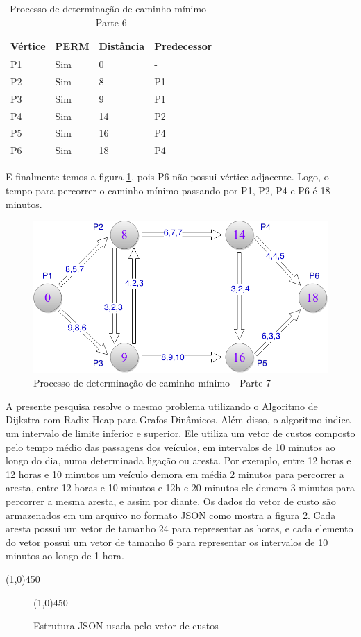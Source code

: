 \begin{table}[htbp]
	\centering
	\begin{tabular}{l l l l}
	\toprule
	Vértice & PERM & Distância & Predecessor\\
	\midrule
	P1 & Sim & 0 & - \\
	P2 & Sim & 8 & P1 \\
	P3 & Sim & 9 & P1 \\
	P4 & Sim & 14 & P2 \\
	P5 & Sim & 16 & P4 \\
	P6 & Sim & 18 & P4 \\
	\bottomrule
	\end{tabular}
\caption{Processo de determinação de caminho mínimo - Parte 6}
 \label{tab:leotab5}
\end{table}
\FloatBarrier

E finalmente temos a figura \ref{fig:leo8}, pois P6 não possui vértice adjacente. Logo, o 
tempo para percorrer o caminho mínimo passando por P1, P2, P4 e P6 é 18 minutos.

\begin{figure}[htbp]
\centering
 \includegraphics[width=.50\textwidth]{chapters/fig/leo8.png}
\caption{Processo de determinação de caminho mínimo - Parte 7}
\label{fig:leo8}
\end{figure}
\FloatBarrier

A presente pesquisa resolve o mesmo problema utilizando o Algoritmo de Dijkstra com Radix Heap para Grafos Dinâmicos.
Além disso, o algoritmo indica um intervalo de limite inferior e superior.
Ele utiliza um vetor de custos composto pelo tempo médio das passagens dos veículos, em intervalos
de 10 minutos ao longo do dia, numa determinada ligação ou aresta. Por exemplo, entre 12 horas e 12 horas e 10 minutos um
veículo demora em média 2 minutos para percorrer a aresta, entre 12 horas e 10 minutos e 12h e 20 minutos ele demora 3 minutos
para percorrer a mesma aresta, e assim por diante. Os dados do vetor de custo são armazenados em um arquivo no formato JSON
como mostra a figura \ref{fig:tabelajson}. Cada aresta possui um vetor de tamanho 24 para representar as horas, e cada elemento
do vetor possui um vetor de tamanho 6 para representar os intervalos de 10 minutos ao longo de 1 hora.
\begin{center}
  \line(1,0){450}
\end{center}

\begin{figure}[htbp]
  \begin{center}
    \line(1,0){450}
  \end{center}
  \centering
  \caption{Estrutura JSON usada pelo vetor de custos}
  \label{fig:tabelajson}
\end{figure}
\FloatBarrier

